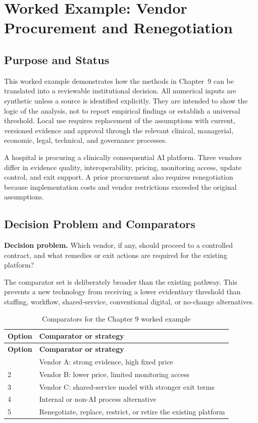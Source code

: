 \section{Worked Example: Vendor Procurement and Renegotiation}
\label{sec:comp-ch09-worked-example}

\subsection{Purpose and Status}
This worked example demonstrates how the methods in Chapter~9 can be
translated into a reviewable institutional decision. All numerical inputs are
synthetic unless a source is identified explicitly. They are intended to show the
logic of the analysis, not to report empirical findings or establish a universal
threshold. Local use requires replacement of the assumptions with current,
versioned evidence and approval through the relevant clinical, managerial,
economic, legal, technical, and governance processes.

A hospital is procuring a clinically consequential AI platform. Three vendors differ in evidence quality, interoperability, pricing, monitoring access, update control, and exit support. A prior procurement also requires renegotiation because implementation costs and vendor restrictions exceeded the original assumptions. 

\subsection{Decision Problem and Comparators}
\textbf{Decision problem.} Which vendor, if any, should proceed to a controlled contract, and what remedies or exit actions are required for the existing platform?

The comparator set is deliberately broader than the existing pathway. This prevents
a new technology from receiving a lower evidentiary threshold than staffing,
workflow, shared-service, conventional digital, or no-change alternatives.

\begin{longtable}{@{}p{}p{}@{}}
\caption{Comparators for the Chapter 9 worked example}
\label{tab:comp-ch09-comparators}\\
\toprule
\textbf{Option} & \textbf{Comparator or strategy} \\
\midrule
\endfirsthead
\toprule
\textbf{Option} & \textbf{Comparator or strategy} \\
\midrule
\endhead
\bottomrule
\endlastfoot
1 & Vendor A: strong evidence, high fixed price \\
2 & Vendor B: lower price, limited monitoring access \\
3 & Vendor C: shared-service model with stronger exit terms \\
4 & Internal or non-AI process alternative \\
5 & Renegotiate, replace, restrict, or retire the existing platform \\
\end{longtable}

